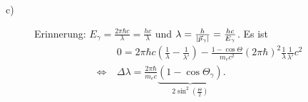 \begin{description}
	\item[c)] Erinnerung: $E_\gamma = \frac{2 \pi \hbar c}{\lambda} = \frac{h c}{\lambda}$ und $\lambda = \frac{h}{\left\lvert \vec{p}_\gamma \right\rvert} = \frac{hc}{E_\gamma}$. Es ist 
	\begin{align*}
		& 0 = 2 \pi \hbar c \left( \frac{1}{\lambda} - \frac{1}{\lambda'} \right) - \frac{1 - \cos \Theta}{m_e c^2} (2 \pi \hbar)^2 \frac{1}{\lambda} \frac{1}{\lambda'} c^2 \\
		\Longleftrightarrow~& \Delta \lambda = \frac{2 \pi \hbar}{m_e c} \underbrace{(1 - \cos \Theta_\gamma)}_{2 \sin^2\left( \frac{\Theta}{2} \right)} \text{.}
	\end{align*}
\end{description}